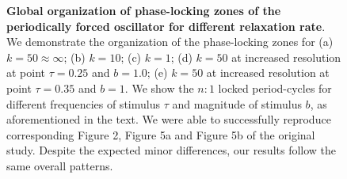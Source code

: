 \begin{figure}[tbph]
    \hfil
    
\caption{\textbf{Global organization of phase-locking zones of the periodically forced oscillator for different relaxation rate}. We demonstrate the organization of the phase-locking zones for (a) $k = 50 \approx \infty$; (b) $k = 10$; (c) $k = 1$; (d) $k = 50$ at increased resolution at point $\tau = 0.25$ and $b = 1.0$; (e) $k = 50$ at increased resolution at point $\tau = 0.35$ and $b = 1$. We show the $n:1$ locked period-cycles for different frequencies of stimulus $\tau$ and magnitude of stimulus $b$, as aforementioned in the text. We were able to successfully reproduce corresponding Figure 2, Figure 5a and Figure 5b of the original study. Despite the expected minor differences, our results follow the same overall patterns.}
    \label{replic}
\end{figure}

